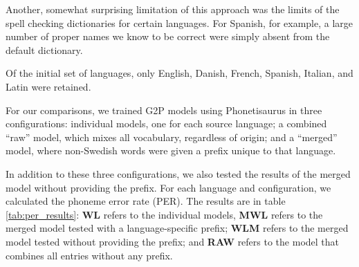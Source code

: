 \documentclass[10pt, a4paper]{article}
\begin{document}
Another, somewhat surprising limitation of this approach was the limits of the spell checking dictionaries for certain languages. For Spanish, for example, a large number of proper names we know to be correct were simply absent from the default dictionary.

Of the initial set of languages, only English, Danish, French, Spanish, Italian, and Latin were retained.

For our comparisons, we trained G2P models using Phonetisaurus \cite{NOVAK_MINEMATSU_HIROSE_2016} in three configurations: individual models, one for each source language; a combined ``raw'' model, which mixes all vocabulary, regardless of origin; and a ``merged'' model, where non-Swedish words were given a prefix unique to that language.

In addition to these three configurations, we also tested the results of the merged model without providing the prefix. For each language and configuration, we calculated the phoneme error rate (PER). The results are in table \ref{tab:per_results}: \textbf{WL} refers to the individual models, \textbf{MWL} refers to the merged model tested with a language-specific prefix; \textbf{WLM} refers to the merged model tested without providing the prefix; and \textbf{RAW} refers to the model that combines all entries without any prefix.





\end{document}
